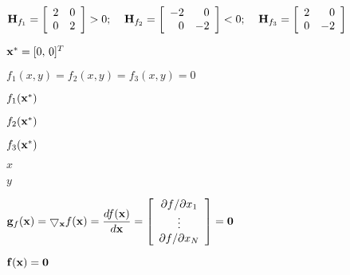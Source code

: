 \documentclass{article}
\def\lthtmlcheckvsize{\ifdim\ht\sizebox<\vsize 
  \ifdim\wd\sizebox<\hsize\expandafter\hfill\fi \expandafter\vfill
  \else\expandafter\vss\fi}%
\begin{document}
{\newpage\clearpage
{}%
$\displaystyle {\bf H}_{f_1}=\left[\begin{array}{rr}2 & 0\\0 & 2\end{array}\right]>0;
\;\;\;\;
{\bf H}_{f_2}=\left[\begin{array}{rr}-2 & 0\\0 & -2\end{array}\right]<0;
\;\;\;\;
{\bf H}_{f_3}=\left[\begin{array}{rr}2 & 0\\0 & -2\end{array}\right]$%
\lthtmlindisplaymathZ
\lthtmlcheckvsize\clearpage}

{\newpage\clearpage
{}%
$ {\bf x}^*=[0,\,0]^T$%
\lthtmlindisplaymathZ
\lthtmlcheckvsize\clearpage}

{\newpage\clearpage
{}%
$ f_1(x,y)=f_2(x,y)=f_3(x,y)=0$%
\lthtmlindisplaymathZ
\lthtmlcheckvsize\clearpage}

{\newpage\clearpage
{}%
$ f_1({\bf x}^*)$%
\lthtmlindisplaymathZ
\lthtmlcheckvsize\clearpage}

{\newpage\clearpage
{}%
$ f_2({\bf x}^*)$%
\lthtmlindisplaymathZ
\lthtmlcheckvsize\clearpage}

{\newpage\clearpage
{}%
$ f_3({\bf x}^*)$%
\lthtmlindisplaymathZ
\lthtmlcheckvsize\clearpage}

{\newpage\clearpage
{}%
$ x$%
\lthtmlindisplaymathZ
\lthtmlcheckvsize\clearpage}

{\newpage\clearpage
{}%
$ y$%
\lthtmlindisplaymathZ
\lthtmlcheckvsize\clearpage}

{\newpage\clearpage
{}%
$\displaystyle {\bf g}_f({\bf x})=\bigtriangledown_{\bf x} f({\bf x})
=\frac{d f({\bf x}) }{d{\bf x}}
=\left[\begin{array}{c}\partial f/\partial x_1\\\vdots\\
\partial f/\partial x_N\end{array}\right] ={\bf0}$%
\lthtmlindisplaymathZ
\lthtmlcheckvsize\clearpage}

{\newpage\clearpage
{}%
$ {\bf f}({\bf x})={\bf0}$%
\lthtmlindisplaymathZ
\lthtmlcheckvsize\clearpage}
\end{document}
